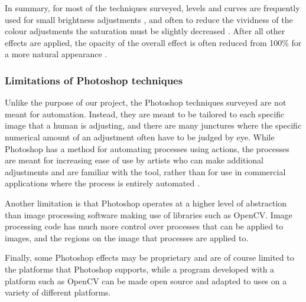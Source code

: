 \begin{longtable}{|N||c|c|c|}
\begin{minipage}{.29\textwidth}
  \end{minipage} \\
    \hline
\end{longtable}

In summary, for most of the techniques surveyed, levels and curves are frequently used for small brightness adjustments \cite{photoshop:obama, photoshop:match_body, photoshop:match_other}, and often to reduce the vividness of the colour adjustments the saturation must be slightly decreased \cite{photoshop:obama, photoshop:match_body}. After all other effects are applied, the opacity of the overall effect is often reduced from 100\% for a more natural appearance \cite{photoshop:obama, photoshop:match_body}.

\subsubsection*{Limitations of Photoshop techniques}
Unlike the purpose of our project, the Photoshop techniques surveyed are not meant for automation. Instead, they are meant to be tailored to each specific image that a human is adjusting, and there are many junctures where the specific numerical amount of an adjustment often have to be judged by eye. While Photoshop has a method for automating processes using actions, the processes are meant for increasing ease of use by artists who can make additional adjustments and are familiar with the tool, rather than for use in commercial applications where the process is entirely automated \cite{photoshop:actions}.

Another limitation is that Photoshop operates at a higher level of abstraction than image processing software making use of libraries such as OpenCV. Image processing code has much more control over processes that can be applied to images, and the regions on the image that processes are applied to. 

Finally, some Photoshop effects may be proprietary and are of course limited to the platforms that Photoshop supports, while a program developed with a platform such as OpenCV can be made open source and adapted to uses on a variety of different platforms.